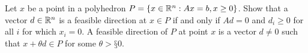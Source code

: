 
Let $x$ be a point in a polyhedron $P=\left\{ x \in \mathbb{R}^n : Ax =  b, x \ge 0 \right \}$. Show that a vector $d \in \mathbb{R}^n$ is a feasible direction at $x \in P$ if and only if $ Ad = 0$ and $d_i\ge 0$ for all $i$ for which $x_i = 0$.  A feasible direction of $P$ at point $x$ is a vector $d \neq 0$ such that $x + \theta d \in P$ for some $\theta > §0$.
